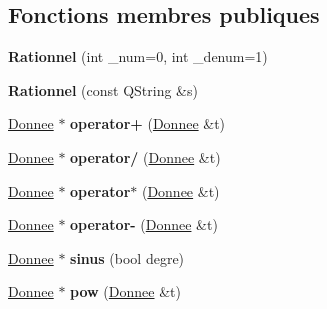 \subsection*{Fonctions membres publiques}
\begin{DoxyCompactItemize}
\item 
\hypertarget{class_rationnel_a455e4f7314244d5d81b83e55e16faed3}{{\bfseries Rationnel} (int \-\_\-num=0, int \-\_\-denum=1)}\label{class_rationnel_a455e4f7314244d5d81b83e55e16faed3}

\item 
\hypertarget{class_rationnel_a26a99758636a64b724fd6cf483695937}{{\bfseries Rationnel} (const Q\-String \&s)}\label{class_rationnel_a26a99758636a64b724fd6cf483695937}

\item 
\hypertarget{class_rationnel_aff1bffbfaa0f73c865c41abc03145d97}{\hyperlink{class_donnee}{Donnee} $\ast$ {\bfseries operator+} (\hyperlink{class_donnee}{Donnee} \&t)}\label{class_rationnel_aff1bffbfaa0f73c865c41abc03145d97}

\item 
\hypertarget{class_rationnel_a3996a46785798dfea002f21f2b7d6fea}{\hyperlink{class_donnee}{Donnee} $\ast$ {\bfseries operator/} (\hyperlink{class_donnee}{Donnee} \&t)}\label{class_rationnel_a3996a46785798dfea002f21f2b7d6fea}

\item 
\hypertarget{class_rationnel_acf49968b7a995107d29172e8fc1d81f6}{\hyperlink{class_donnee}{Donnee} $\ast$ {\bfseries operator$\ast$} (\hyperlink{class_donnee}{Donnee} \&t)}\label{class_rationnel_acf49968b7a995107d29172e8fc1d81f6}

\item 
\hypertarget{class_rationnel_afef41ceb9a7ac342623b10e51023fdf7}{\hyperlink{class_donnee}{Donnee} $\ast$ {\bfseries operator-\/} (\hyperlink{class_donnee}{Donnee} \&t)}\label{class_rationnel_afef41ceb9a7ac342623b10e51023fdf7}

\item 
\hypertarget{class_rationnel_a0b7a4036835138e1be1d57de8dfc7c75}{\hyperlink{class_donnee}{Donnee} $\ast$ {\bfseries sinus} (bool degre)}\label{class_rationnel_a0b7a4036835138e1be1d57de8dfc7c75}

\item 
\hypertarget{class_rationnel_a0c1d532ab3612bc69b00aa1bf94a3391}{\hyperlink{class_donnee}{Donnee} $\ast$ {\bfseries pow} (\hyperlink{class_donnee}{Donnee} \&t)}\label{class_rationnel_a0c1d532ab3612bc69b00aa1bf94a3391}


\end{DoxyCompactItemize}
